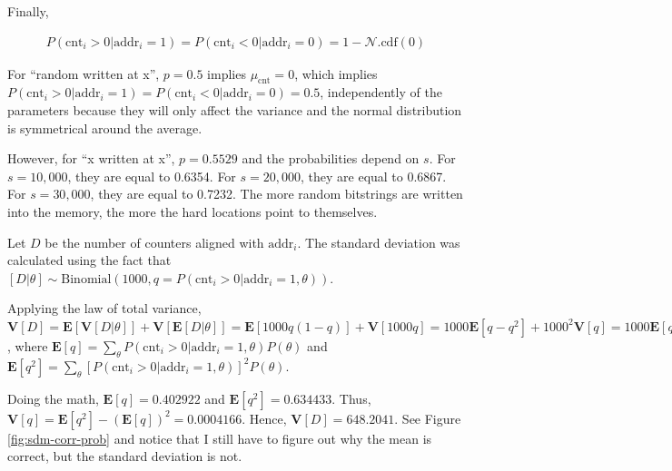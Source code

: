 Finally,

\begin{align}
P(\text{cnt}_i > 0 | \text{addr}_i = 1) = P(\text{cnt}_i < 0 | \text{addr}_i = 0) = 1 - \mathcal{N}.\text{cdf}(0)
\end{align}

For ``random written at x'', $p=0.5$ implies $\mu_\text{cnt} = 0$, which implies $P(\text{cnt}_i > 0 | \text{addr}_i = 1) = P(\text{cnt}_i < 0 | \text{addr}_i = 0) = 0.5$, independently of the parameters because they will only affect the variance and the normal distribution is symmetrical around the average.

However, for ``x written at x'', $p=0.5529$ and the probabilities depend on $s$. For $s=10,000$, they are equal to 0.6354. For $s=20,000$, they are equal to 0.6867. For $s=30,000$, they are equal to 0.7232. The more random bitstrings are written into the memory, the more the hard locations point to themselves.

Let $D$ be the number of counters aligned with $\text{addr}_i$. The standard deviation was calculated using the fact that $[D|\theta] \sim \text{Binomial}(1000, q=P(\text{cnt}_i > 0 | \text{addr}_i=1, \theta))$.

Applying the law of total variance, $\mathbf{V}[D] = \mathbf{E}[\mathbf{V}[D|\theta]] + \mathbf{V}[\mathbf{E}[D|\theta]] = \mathbf{E}[1000 q (1-q)] + \mathbf{V}[1000 q] = 1000 \mathbf{E}[q-q^2] + 1000^2 \mathbf{V}[q] = 1000 \mathbf{E}[q](1-\mathbf{E}[q]) + 1000(1000-1)\mathbf{V}[q]$, where $\mathbf{E}[q] = \sum_\theta P(\text{cnt}_i > 0 | \text{addr}_i=1, \theta) P(\theta)$ and $\mathbf{E}[q^2] = \sum_\theta [P(\text{cnt}_i > 0 | \text{addr}_i=1, \theta)]^2 P(\theta)$.

Doing the math, $\mathbf{E}[q] = 0.402922$ and $\mathbf{E}[q^2] = 0.634433$. Thus, $\mathbf{V}[q] = \mathbf{E}[q^2] - (\mathbf{E}[q])^2 = 0.0004166$. Hence, $\mathbf{V}[D] = 648.2041$. See Figure \ref{fig:sdm-corr-prob} and notice that I still have to figure out why the mean is correct, but the standard deviation is not.

